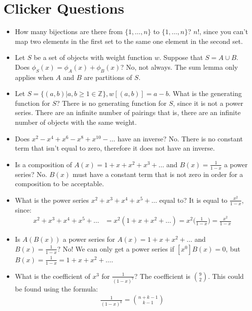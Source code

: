 \documentclass[]{article}
\theoremstyle{definition}
\newcommand{\union}{\cup}
\newcommand{\lecture}[1]{\marginpar{{\footnotesize $\leftarrow$ \underline{#1}}}}
\begin{document}
	\section*{Clicker Questions}
		\begin{itemize}
			\item \lecture{January 21, 2013} How many bijections are there from $\{1, \ldots, n\}$ to $\{1, \ldots, n\}$? $n!$, since you can't map two elements in the first set to the same one element in the second set.
			\item Let $S$ be a set of objects with weight function $w$. Suppose that $S = A \union B$. Does $\phi_S(x) = \phi_A(x) + \phi_B(x)$? No, not always. The sum lemma only applies when $A$ and $B$ are partitions of $S$.
			\item Let $S = \{(a, b) | a, b \ge 1 \in \mathbb{Z}\}, w[(a, b)] = a - b$. What is the generating function for $S$? There is no generating function for $S$, since it is not a power series. There are an infinite number of pairings \textendash{} that is, there are an infinite number of objects with the same weight.
			\item Does $x^2 - x^4 + x^6 - x^8 + x^10 - \ldots$ have an inverse? No. There is no constant term that isn't equal to zero, therefore it does not have an inverse.
			\item Is a composition of $A(x) = 1 + x + x^2 + x^3 + \ldots$ and $B(x) = \frac{1}{1 - x}$ a power series? No. $B(x)$ must have a constant term that is not zero in order for a composition to be acceptable.
			\item \lecture{January 30, 2013} What is the power series $x^2 + x^3 + x^4 + x^5 + \ldots$ equal to? It is equal to $\frac{x^2}{1 - x}$, since:
				\begin{align*}
					x^2 + x^3 + x^4 + x^5 + \ldots &= x^2(1 + x + x^2 + \ldots) = x^2 \bigg(\frac{1}{1 - x}\bigg) = \frac{x^2}{1 - x}
				\end{align*}
			\item Is $A(B(x))$ a power series for $A(x) = 1 + x + x^2 + \ldots$ and $B(x) = \frac{1}{1 - x}$? No! We can only get a power series if $[x^0]B(x) = 0$, but $B(x) = \frac{1}{1 - x} = 1 + x + x^2 + \ldots$.
			\item What is the coefficient of $x^3$ for $\frac{1}{(1 - x)^7}$? The coefficient is ${9 \choose 2}$. This could be found using the formula:
				\begin{align*}
					[x^n] \frac{1}{(1 - x)^k} = { n + k - 1 \choose k - 1 }
				\end{align*}

\end{itemize}
\end{document}
